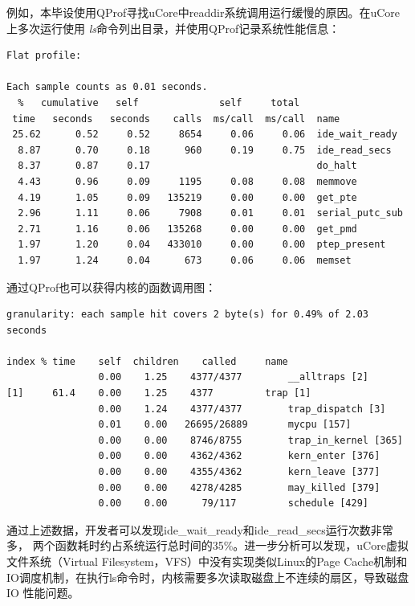 	例如，本毕设使用QProf寻找uCore中readdir系统调用运行缓慢的原因。在uCore上多次运行使用
	\emph{ls}命令列出目录，并使用QProf记录系统性能信息：
	{\tiny
	\begin{Verbatim}[frame=single]
Flat profile:

Each sample counts as 0.01 seconds.
  %   cumulative   self              self     total
 time   seconds   seconds    calls  ms/call  ms/call  name
 25.62      0.52     0.52     8654     0.06     0.06  ide_wait_ready
  8.87      0.70     0.18      960     0.19     0.75  ide_read_secs
  8.37      0.87     0.17                             do_halt
  4.43      0.96     0.09     1195     0.08     0.08  memmove
  4.19      1.05     0.09   135219     0.00     0.00  get_pte
  2.96      1.11     0.06     7908     0.01     0.01  serial_putc_sub
  2.71      1.16     0.06   135268     0.00     0.00  get_pmd
  1.97      1.20     0.04   433010     0.00     0.00  ptep_present
  1.97      1.24     0.04      673     0.06     0.06  memset
	\end{Verbatim}
	}

	通过QProf也可以获得内核的函数调用图：

	{\tiny
	\begin{Verbatim}[frame=single]
granularity: each sample hit covers 2 byte(s) for 0.49% of 2.03 seconds

index % time    self  children    called     name
                0.00    1.25    4377/4377        __alltraps [2]
[1]     61.4    0.00    1.25    4377         trap [1]
                0.00    1.24    4377/4377        trap_dispatch [3]
                0.01    0.00   26695/26889       mycpu [157]
                0.00    0.00    8746/8755        trap_in_kernel [365]
                0.00    0.00    4362/4362        kern_enter [376]
                0.00    0.00    4355/4362        kern_leave [377]
                0.00    0.00    4278/4285        may_killed [379]
                0.00    0.00      79/117         schedule [429]
	\end{Verbatim}
	}

	通过上述数据，开发者可以发现ide\_wait\_ready和ide\_read\_secs运行次数非常多，
两个函数耗时约占系统运行总时间的35\%。进一步分析可以发现，uCore虚拟文件系统（Virtual
Filesystem，VFS）中没有实现类似Linux的Page
Cache机制和IO调度机制，在执行ls命令时，内核需要多次读取磁盘上不连续的扇区，导致磁盘IO
性能问题。

